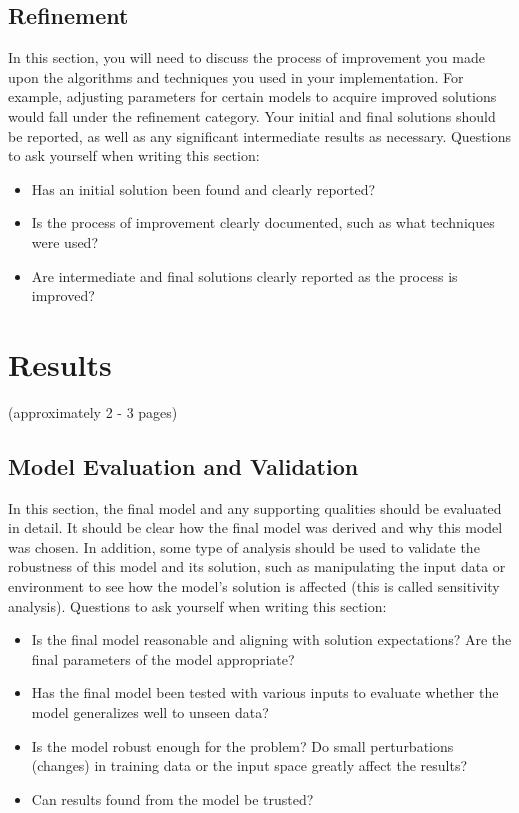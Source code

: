 \documentclass[twoside,openright,titlepage,numbers=noenddot,headinclude,%
               footinclude=true,cleardoublepage=empty,abstractoff,BCOR=5mm,%
               paper=a4,fontsize=11pt,ngerman,american]{scrreprt}
\numberwithin{theorem}{chapter}
\numberwithin{definition}{chapter}
\numberwithin{algorithm}{chapter}
\numberwithin{figure}{chapter}
\numberwithin{table}{chapter}
\numberwithin{equation}{chapter}
\begin{document}
\section*{Refinement}
In this section, you will need to discuss the process of improvement you made upon the algorithms and techniques you used in your implementation. For example, adjusting parameters for certain models to acquire improved solutions would fall under the refinement category. Your initial and final solutions should be reported, as well as any significant intermediate results as necessary. Questions to ask yourself when writing this section:
\begin{itemize}%
\item Has an initial solution been found and clearly reported?
\item Is the process of improvement clearly documented, such as what techniques were used?
\item Are intermediate and final solutions clearly reported as the process is improved?
\end{itemize}

\chapter*{Results}
(approximately 2 - 3 pages)


\section*{Model Evaluation and Validation}
In this section, the final model and any supporting qualities should be evaluated in detail. It should be clear how the final model was derived and why this model was chosen. In addition, some type of analysis should be used to validate the robustness of this model and its solution, such as manipulating the input data or environment to see how the model’s solution is affected (this is called sensitivity analysis). Questions to ask yourself when writing this section:
\begin{itemize}%
\item Is the final model reasonable and aligning with solution expectations? Are the final parameters of the model appropriate?
\item Has the final model been tested with various inputs to evaluate whether the model generalizes well to unseen data?
\item Is the model robust enough for the problem? Do small perturbations (changes) in training data or the input space greatly affect the results?
\item Can results found from the model be trusted?
\end{itemize}
\end{document}
